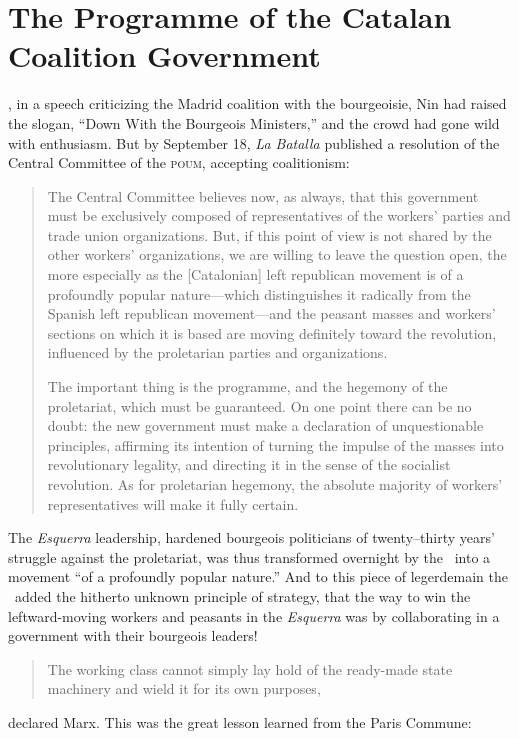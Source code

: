 \chapter{The Programme of the Catalan Coalition Government}

, in a speech criticizing the Madrid coalition with the bourgeoisie, Nin had raised the slogan, ``Down With the Bourgeois Ministers,'' and the crowd had gone wild with enthusiasm. But by September 18, \emph{La Batalla} published a resolution of the Central Committee of the \textsc{poum}, accepting coalitionism:

\begin{quotation}
  The Central Committee believes now, as always, that this government must be exclusively composed of representatives of the workers’ parties and trade union organizations. But, if this point of view is not shared by the other workers’ organizations, we are willing to leave the question open, the more especially as the [Catalonian] left republican movement is of a profoundly popular nature---which distinguishes it radically from the Spanish left republican movement---and the peasant masses and workers’ sections on which it is based are moving definitely toward the revolution, influenced by the proletarian parties and organizations.
  
  The important thing is the programme, and the hegemony of the proletariat, which must be guaranteed. On one point there can be no doubt: the new government must make a declaration of unquestionable principles, affirming its intention of turning the impulse of the masses into revolutionary legality, and directing it in the sense of the socialist revolution. As for proletarian hegemony, the absolute majority of workers’ representatives will make it fully certain.
\end{quotation}

The \emph{Esquerra} leadership, hardened bourgeois politicians of twenty--thirty years’ struggle against the proletariat, was thus transformed overnight by the \POUM\ into a movement ``of a profoundly popular nature.'' And to this piece of legerdemain the \POUM\ added the hitherto unknown principle of strategy, that the way to win the leftward-moving workers and peasants in the \emph{Esquerra} was by collaborating in a government with their bourgeois leaders!

\begin{quotation}
  The working class cannot simply lay hold of the ready-made state machinery and wield it for its own purposes,
\end{quotation}
declared Marx. This was the great lesson learned from the Paris Commune:

